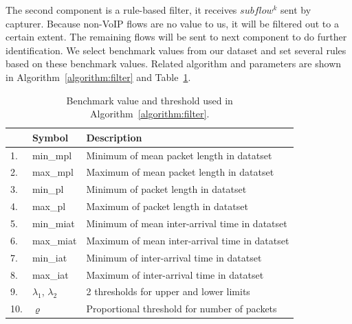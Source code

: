 \documentclass[conference]{IEEEtran}
\begin{document}
The second component is a rule-based filter, it receives $subflow^k$ sent by capturer. Because non-VoIP flows are no value to us, it will be filtered out to a certain extent. The remaining flows will be sent to next component to do further identification. We select benchmark values from our dataset and set several rules based on these benchmark values. Related algorithm and parameters are shown in Algorithm~\ref{algorithm:filter} and Table~\ref{tab:rules}.

\begin{table}[htbp]
  \caption{Benchmark value and threshold used in Algorithm~\ref{algorithm:filter}.}
  \label{tab:rules}
  \centering
  \begin{tabular}{l l l}
    \hline
    \textbf{} & \textbf{Symbol} & \textbf{Description}\\
    \hline
    1. & min\_mpl      &   Minimum of mean packet length in datatset\\
    2. & max\_mpl      &  Maximum of mean packet length in datatset\\
    3. & min\_pl      &   Minimum of packet length in datatset\\
    4. & max\_pl      &   Maximum of packet length in datatset\\
    5. & min\_miat      &   Minimum of mean inter-arrival time in datatset\\
    6. & max\_miat      &   Maximum of mean inter-arrival time in datatset\\
    7. & min\_iat      &   Minimum of inter-arrival time in datatset\\
    8. & max\_iat      &  Maximum of inter-arrival time in datatset\\
    9. & ${\lambda_1}$, ${\lambda_2}$      &  2 thresholds for upper and lower limits \\
    10. & ${\varrho}$    &   Proportional threshold for number of packets\\
    \hline
  \end{tabular}
\end{table}

\renewcommand{\algorithmicrequire}{\textbf{Input:}}
\renewcommand{\algorithmicensure}{\textbf{Output:}}
\end{document}
